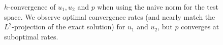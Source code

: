 \begin{figure}[h!b!p!]
{\label{fig:pressurenaive_h}
}
\caption{$h$-convergence of $u_{1},u_{2}$ and $p$ when using the naive norm for the test space.  We observe optimal convergence rates (and nearly match the $L^{2}$-projection of the exact solution) for $u_{1}$ and $u_{2}$, but $p$ converges at suboptimal rates.
}
\label{fig:naive_h}
\end{figure}


\begin{figure}[h!b!p!]
\centering
{}
\end{figure}
